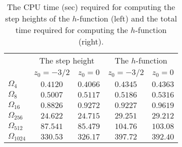 \begin{table}[h]
  \caption{The CPU time (sec) required for computing the step heights of the $h$-function (left) and the total time required for computing the $h$-function (right).}
  \label{tab:time}
\centering
\begin{tabular}{l|cc|cc}  \hline
                  & \multicolumn{2}{c|}{The step height}  & \multicolumn{2}{c}{The $h$-function}  \\ \cline{2-5}
                  & $z_0=-3/2$  & $z_0=0$    & $z_0=-3/2$  & $z_0=0$  \\ \hline
 $\Omega_4$       & $0.4120$    & $0.4066$   & $0.4345$    & $0.4363$\\
 $\Omega_8$       & $0.5007$    & $0.5117$   & $0.5186$    & $0.5316$  \\
 $\Omega_{16}$    & $0.8826$    & $0.9272$   & $0.9227$    & $0.9619$  \\
%
 $\Omega_{256}$   & $24.622$    & $24.715$   & $29.251$    & $29.212$  \\
 $\Omega_{512}$   & $87.541$    & $85.479$   & $104.76$    & $103.08$  \\
 $\Omega_{1024}$  & $330.53$    & $326.17$   & $397.72$    & $392.40$  \\
\hline
\end{tabular}
\end{table}

       
       
        
       
       

